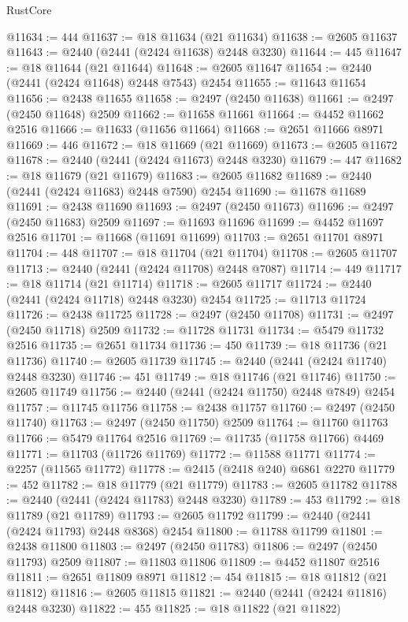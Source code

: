 \begin{lexlean}{RustCore}
\begin{coremodule}
@11634 := 444
@11637 := @18 @11634 (@21 @11634)
@11638 := @2605 @11637
@11643 := @2440 (@2441 (@2424 @11638) @2448 @3230)
@11644 := 445
@11647 := @18 @11644 (@21 @11644)
@11648 := @2605 @11647
@11654 := @2440 (@2441 (@2424 @11648) @2448 @7543) @2454
@11655 := @11643 @11654
@11656 := @2438 @11655
@11658 := @2497 (@2450 @11638)
@11661 := @2497 (@2450 @11648) @2509
@11662 := @11658 @11661
@11664 := @4452 @11662 @2516
@11666 := @11633 (@11656 @11664)
@11668 := @2651 @11666 @8971
@11669 := 446
@11672 := @18 @11669 (@21 @11669)
@11673 := @2605 @11672
@11678 := @2440 (@2441 (@2424 @11673) @2448 @3230)
@11679 := 447
@11682 := @18 @11679 (@21 @11679)
@11683 := @2605 @11682
@11689 := @2440 (@2441 (@2424 @11683) @2448 @7590) @2454
@11690 := @11678 @11689
@11691 := @2438 @11690
@11693 := @2497 (@2450 @11673)
@11696 := @2497 (@2450 @11683) @2509
@11697 := @11693 @11696
@11699 := @4452 @11697 @2516
@11701 := @11668 (@11691 @11699)
@11703 := @2651 @11701 @8971
@11704 := 448
@11707 := @18 @11704 (@21 @11704)
@11708 := @2605 @11707
@11713 := @2440 (@2441 (@2424 @11708) @2448 @7087)
@11714 := 449
@11717 := @18 @11714 (@21 @11714)
@11718 := @2605 @11717
@11724 := @2440 (@2441 (@2424 @11718) @2448 @3230) @2454
@11725 := @11713 @11724
@11726 := @2438 @11725
@11728 := @2497 (@2450 @11708)
@11731 := @2497 (@2450 @11718) @2509
@11732 := @11728 @11731
@11734 := @5479 @11732 @2516
@11735 := @2651 @11734
@11736 := 450
@11739 := @18 @11736 (@21 @11736)
@11740 := @2605 @11739
@11745 := @2440 (@2441 (@2424 @11740) @2448 @3230)
@11746 := 451
@11749 := @18 @11746 (@21 @11746)
@11750 := @2605 @11749
@11756 := @2440 (@2441 (@2424 @11750) @2448 @7849) @2454
@11757 := @11745 @11756
@11758 := @2438 @11757
@11760 := @2497 (@2450 @11740)
@11763 := @2497 (@2450 @11750) @2509
@11764 := @11760 @11763
@11766 := @5479 @11764 @2516
@11769 := @11735 (@11758 @11766) @4469
@11771 := @11703 (@11726 @11769)
@11772 := @11588 @11771
@11774 := @2257 (@11565 @11772)
@11778 := @2415 (@2418 @240) @6861 @2270
@11779 := 452
@11782 := @18 @11779 (@21 @11779)
@11783 := @2605 @11782
@11788 := @2440 (@2441 (@2424 @11783) @2448 @3230)
@11789 := 453
@11792 := @18 @11789 (@21 @11789)
@11793 := @2605 @11792
@11799 := @2440 (@2441 (@2424 @11793) @2448 @8368) @2454
@11800 := @11788 @11799
@11801 := @2438 @11800
@11803 := @2497 (@2450 @11783)
@11806 := @2497 (@2450 @11793) @2509
@11807 := @11803 @11806
@11809 := @4452 @11807 @2516
@11811 := @2651 @11809 @8971
@11812 := 454
@11815 := @18 @11812 (@21 @11812)
@11816 := @2605 @11815
@11821 := @2440 (@2441 (@2424 @11816) @2448 @3230)
@11822 := 455
@11825 := @18 @11822 (@21 @11822)

\end{coremodule}
\end{lexlean}
